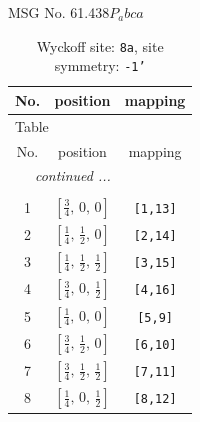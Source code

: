 \documentclass[fleqn,8pt]{jsarticle}
\begin{document}
\setcounter{MaxMatrixCols}{32}

\renewcommand{\tablename}{Table~}
\renewcommand{\figurename}{Figure~}
\begin{center}
\LARGE
MSG No. 61.438\quad$P_{a}bca$
\end{center}
\renewcommand{\arraystretch}{1.2}
\begin{longtable}{ccc}
\caption{Wyckoff site: {\tt 8a}, site symmetry: {\tt -1'}}
 \\
 \hline \hline
No. & position & mapping \\ \hline \endfirsthead

\multicolumn{2}{l}{\tablename\ \thetable{}} \\
 \hline \hline
No. & position & mapping \\ \hline \endhead

 \hline \hline
\multicolumn{2}{r}{\footnotesize\it continued ...} \\ \endfoot

 \hline \hline
\multicolumn{2}{r}{} \\ \endlastfoot

1 & $\left[ \frac{3}{4},\, 0,\, 0 \right]$ & {\tt [1,13]} \\ \hline
2 & $\left[ \frac{1}{4},\, \frac{1}{2},\, 0 \right]$ & {\tt [2,14]} \\ \hline
3 & $\left[ \frac{1}{4},\, \frac{1}{2},\, \frac{1}{2} \right]$ & {\tt [3,15]} \\ \hline
4 & $\left[ \frac{3}{4},\, 0,\, \frac{1}{2} \right]$ & {\tt [4,16]} \\ \hline
5 & $\left[ \frac{1}{4},\, 0,\, 0 \right]$ & {\tt [5,9]} \\ \hline
6 & $\left[ \frac{3}{4},\, \frac{1}{2},\, 0 \right]$ & {\tt [6,10]} \\ \hline
7 & $\left[ \frac{3}{4},\, \frac{1}{2},\, \frac{1}{2} \right]$ & {\tt [7,11]} \\ \hline
8 & $\left[ \frac{1}{4},\, 0,\, \frac{1}{2} \right]$ & {\tt [8,12]} \\
\end{longtable}
\renewcommand{\arraystretch}{1.2}
\end{document}
